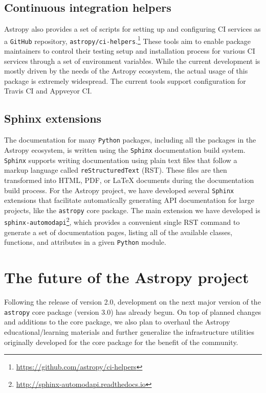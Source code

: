 \documentclass[modern]{aastex61}
\newcommand{\package}[1]{\texttt{#1}\xspace}
\newcommand{\github}{\package{GitHub}}
\newcommand{\python}{\package{Python}}
\newcommand{\astropy}{Astropy\xspace}
\newcommand{\astropypkg}{\package{astropy}}
\begin{document}
\subsection{Continuous integration helpers}

\astropy also provides a set of scripts for setting up and configuring
CI services as a \github repository,
\package{astropy/ci-helpers}.\footnote{\url{https://github.com/astropy/ci-helpers}}
These tools aim to enable package maintainers to control their testing setup
and installation process for various CI services through a
set of environment variables.
While the current development is mostly driven by the needs of the \astropy
ecosystem, the actual usage of this package is extremely widespread. The current
tools support configuration for Travis CI and Appveyor CI.

\subsection{Sphinx extensions}

The documentation for many \python packages, including
all the packages in the \astropy ecosystem, is written using the
\package{Sphinx} documentation build system.
\package{Sphinx} supports writing documentation using plain text files
that follow a markup language called \texttt{reStructuredText} (RST).
These files are then transformed into HTML, PDF, or \LaTeX{} documents
during the documentation build process.
For the \astropy project, we have developed several \package{Sphinx} extensions
that facilitate automatically generating API documentation for large projects,
like the \astropypkg core package.
The main extension we have developed is
\package{sphinx-automodapi}\footnote{\url{http://sphinx-automodapi.readthedocs.io}},
which provides a convenient single RST command to generate a set of
documentation pages, listing all of the available classes, functions, and
attributes in a given \python module.

\section{The future of the Astropy project}
\label{sec:future}

Following the release of version 2.0, development on the next major version of
the \astropypkg core package (version 3.0) has already begun.
On top of planned changes and additions to the core package, we also plan to
overhaul the \astropy educational/learning materials and further
generalize the infrastructure utilities originally developed for the core
package for the benefit of the community.
\end{document}
